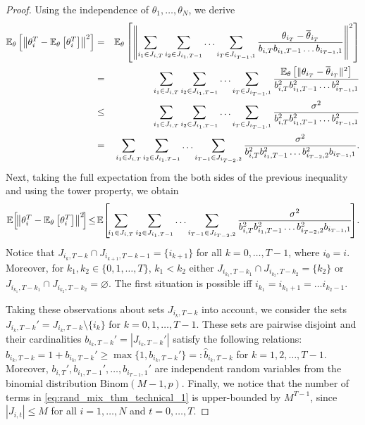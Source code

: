 \begin{proof}
Using the independence of $\theta_1,\ldots,\theta_N$, we derive
\begin{eqnarray*}
    \mathbb{E}_\theta\left[\left\|\theta_i^T - \mathbb{E}_{\theta}\left[\theta_i^T\right]\right\|^2\right] &=& \mathbb{E}_\theta\left[\left\|\sum\limits_{i_1\in J_{i,T}}\sum\limits_{i_2\in J_{i_1,T-1}}\ldots \sum\limits_{i_{T}\in J_{i_{T-1},1}}\frac{\theta_{i_T} - \overline{\theta}_{i_T}}{b_{i,T} b_{i_1,T-1}\ldots b_{i_{T-1},1}}\right\|^2\right]\\
    &=& \sum\limits_{i_1\in J_{i,T}}\sum\limits_{i_2\in J_{i_1,T-1}}\ldots \sum\limits_{i_{T}\in J_{i_{T-1},1}}\frac{\mathbb{E}_\theta\left[\|\theta_{i_T} - \overline{\theta}_{i_T}\|^2\right]}{b_{i,T}^2 b_{i_1,T-1}^2\ldots b_{i_{T-1},1}^2}\\
    &\le& \sum\limits_{i_1\in J_{i,T}}\sum\limits_{i_2\in J_{i_1,T-1}}\ldots \sum\limits_{i_{T}\in J_{i_{T-1},1}}\frac{\sigma^2}{b_{i,T}^2 b_{i_1,T-1}^2\ldots b_{i_{T-1},1}^2}\\
    &=& \sum\limits_{i_1\in J_{i,T}}\sum\limits_{i_2\in J_{i_1,T-1}}\ldots \sum\limits_{i_{T-1}\in J_{i_{T-2},2}}\frac{\sigma^2}{b_{i,T}^2 b_{i_1,T-1}^2\ldots b_{i_{T-2},2}^2b_{i_{T-1},1}}.
\end{eqnarray*}
Next, taking the full expectation from the both sides of the previous inequality and using the tower property, we obtain
\begin{equation}
     \EE\!\left[\!\left\|\theta_i^T - \EE_{\theta}\left[\theta_i^T\right]\right\|^2\!\right] \!\le\! \EE\!\left[\!\sum\limits_{i_1\in J_{i,T}}\sum\limits_{i_2\in J_{i_1,T-1}}\ldots \sum\limits_{i_{T-1}\in J_{i_{T-2},2}}\frac{\sigma^2}{b_{i,T}^2 b_{i_1,T-1}^2\ldots b_{i_{T-2},2}^2b_{i_{T-1},1}}\!\right]\!. \label{eq:rand_mix_thm_technical_1}
\end{equation}
Notice that $J_{i_k,T-k} \cap J_{i_{k+1},T-k-1} = \{i_{k+1}\}$ for all $k=0,\ldots,T-1$, where $i_0 = i$. Moreover, for $k_1, k_2 \in\{0,1,\ldots,T\}$, $k_1 < k_2$ either $J_{i_{k_1},T-k_1} \cap J_{i_{k_2},T-k_2} = \{k_2\}$ or $J_{i_{k_1},T-k_1} \cap J_{i_{k_2},T-k_2} = \varnothing$. The first situation is possible iff $i_{k_1} = i_{k_1+1} = \ldots i_{k_2-1}$.

Taking these observations about sets $J_{i_{k}, T-k}$ into account, we consider the sets $J_{i_k,T-k}' = J_{i_k,T-k}\setminus\{i_{k}\}$ for $k = 0, 1, \ldots, T-1$. These sets are pairwise disjoint and their cardinalities $b_{i_k,T-k}' = |J_{i_k,T-k}'|$ satisfy the following relations: $b_{i_k,T-k} = 1 + b_{i_k,T-k}' \ge \max\{1, b_{i_k,T-k}'\} =: \hat{b}_{i_k,T-k}$ for $k = 1, 2, \ldots, T-1$. Moreover, $b_{i,T}', b_{i_1,T-1}',\ldots, b_{i_{T-1},1}'$ are independent random variables from the binomial distribution $\text{Binom}(M-1, p)$. Finally, we notice that the number of terms in \eqref{eq:rand_mix_thm_technical_1} is upper-bounded by $M^{T-1}$, since $|J_{i,t}| \le M$ for all $i = 1,\ldots,N$ and $t=0,\ldots,T$.


\end{proof}
